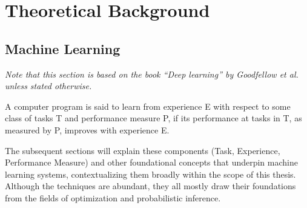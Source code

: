 \section{Theoretical Background}\label{section::theoretical_background}

\subsection{Machine Learning}
\textit{Note that this section is based on the book ``Deep learning'' by Goodfellow et al. \cite{goodfellow2016deep} unless stated otherwise.}

\begin{definition}
A computer program is said to learn from experience E with respect to some class of tasks T and performance measure P, if its performance at tasks in T, as measured by P, improves with experience E.
\end{definition}
The subsequent sections will explain these components (Task, Experience, Performance Measure) and other foundational concepts that underpin machine learning systems, contextualizing them broadly within the scope of this thesis. Although the techniques are abundant, they all mostly draw their foundations from the fields of optimization and probabilistic inference.

